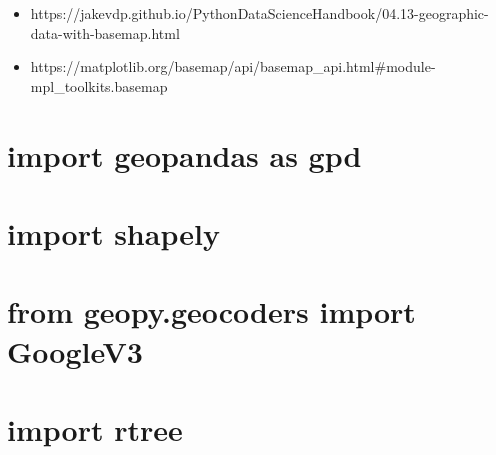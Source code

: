 \documentclass[11pt]{article}
\providecommand{\tightlist}{%
      \setlength{\itemsep}{0pt}\setlength{\parskip}{0pt}}
\begin{document}
\begin{itemize}
\tightlist
\item
  https://jakevdp.github.io/PythonDataScienceHandbook/04.13-geographic-data-with-basemap.html
\item
  https://matplotlib.org/basemap/api/basemap\_api.html\#module-mpl\_toolkits.basemap
\end{itemize}

\section{import geopandas as gpd}\label{import-geopandas-as-gpd}

\section{import shapely}\label{import-shapely}

\section{from geopy.geocoders import
GoogleV3}\label{from-geopy.geocoders-import-googlev3}

\section{import rtree}\label{import-rtree}


    
    
    
    
\end{document}
